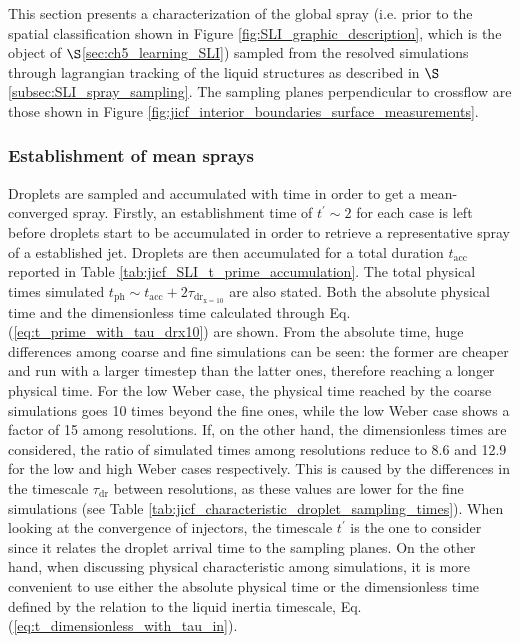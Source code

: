 
This section presents a characterization of the global spray (i.e. prior to the spatial classification shown in Figure \ref{fig:SLI_graphic_description}, which is the object of $\S$\ref{sec:ch5_learning_SLI}) sampled from the resolved simulations through lagrangian tracking of the liquid structures as described in $\S$\ref{subsec:SLI_spray_sampling}. The sampling planes perpendicular to crossflow are those shown in Figure \ref{fig:jicf_interior_boundaries_surface_measurements}.


\subsubsection*{Establishment of mean sprays}

Droplets are sampled and accumulated with time in order to get a mean-converged spray. Firstly, an establishment time of $t^{\prime} \sim 2$ for each case is left before droplets start to be accumulated in order to retrieve a representative spray of a established jet. Droplets are then accumulated for a total duration $t_\mathrm{acc}$ reported in Table \ref{tab:jicf_SLI_t_prime_accumulation}. The total physical times simulated $t_\mathrm{ph} \sim t_\mathrm{acc} + 2 \tau_\mathrm{dr_{x=10}}$ are also stated. Both the absolute physical time and the dimensionless time calculated through Eq. (\ref{eq:t_prime_with_tau_drx10}) are shown. From the absolute time, huge differences among coarse and fine simulations can be seen: the former are cheaper and run with a larger timestep than the latter ones, therefore reaching a longer physical time. For the low Weber case, the physical time reached by the coarse simulations goes 10 times beyond the fine ones, while the low Weber case shows a factor of 15 among resolutions. If, on the other hand, the dimensionless times are considered, the ratio of simulated times among resolutions reduce to 8.6 and 12.9 for the low and high Weber cases respectively. This is caused by the differences in the timescale $\tau_\mathrm{dr}$ between resolutions, as these values are lower for the fine simulations (see Table \ref{tab:jicf_characteristic_droplet_sampling_times}). When looking at the convergence of injectors, the timescale $t^{\prime}$ is the one to consider since it relates the droplet arrival time to the sampling planes. On the other hand, when discussing physical characteristic among simulations, it is more convenient to use either the absolute physical time or the dimensionless time defined by the relation to the liquid inertia timescale, Eq. (\ref{eq:t_dimensionless_with_tau_in}).


